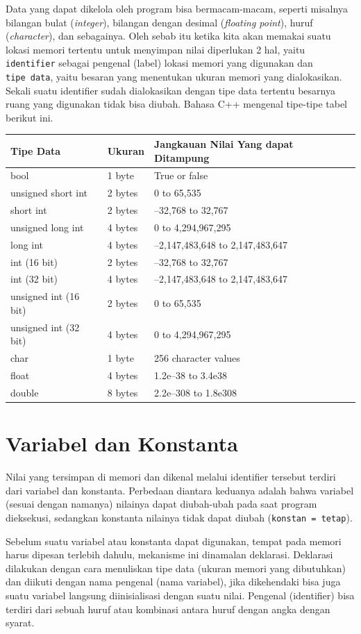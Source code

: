 Data yang dapat dikelola oleh program bisa bermacam-macam, seperti
misalnya bilangan bulat (\emph{integer}), bilangan dengan desimal
(\emph{floating point}), huruf (\emph{character}), dan sebagainya. Oleh
sebab itu ketika kita akan memakai suatu lokasi memori tertentu untuk
menyimpan nilai diperlukan 2 hal, yaitu \texttt{identifier} sebagai
pengenal (label) lokasi memori yang digunakan dan \texttt{tipe\ data},
yaitu besaran yang menentukan ukuran memori yang dialokasikan. Sekali
suatu identifier sudah dialokasikan dengan tipe data tertentu besarnya
ruang yang digunakan tidak bisa diubah. Bahasa C++ mengenal tipe-tipe
tabel berikut ini.


\begin{longtable}[]{@{}lll@{}}
\toprule
Tipe Data & Ukuran & Jangkauan Nilai Yang dapat Ditampung\tabularnewline
\midrule
\endhead
bool & 1 byte & True or false\tabularnewline
unsigned short int & 2 bytes & 0 to 65,535\tabularnewline
short int & 2 bytes & --32,768 to 32,767\tabularnewline
unsigned long int & 4 bytes & 0 to 4,294,967,295\tabularnewline
long int & 4 bytes & --2,147,483,648 to 2,147,483,647\tabularnewline
int (16 bit) & 2 bytes & --32,768 to 32,767\tabularnewline
int (32 bit) & 4 bytes & --2,147,483,648 to 2,147,483,647\tabularnewline
unsigned int (16 bit) & 2 bytes & 0 to 65,535\tabularnewline
unsigned int (32 bit) & 4 bytes & 0 to 4,294,967,295\tabularnewline
char & 1 byte & 256 character values\tabularnewline
float & 4 bytes & 1.2e--38 to 3.4e38\tabularnewline
double & 8 bytes & 2.2e--308 to 1.8e308\tabularnewline
\bottomrule

\end{longtable}


\section{Variabel dan Konstanta}\label{variabel-dan-konstanta}

Nilai yang tersimpan di memori dan dikenal melalui identifier tersebut
terdiri dari variabel dan konstanta. Perbedaan diantara keduanya adalah
bahwa variabel (sesuai dengan namanya) nilainya dapat diubah-ubah pada
saat program dieksekusi, sedangkan konstanta nilainya tidak dapat diubah
(\texttt{konstan\ =\ tetap}).

Sebelum suatu variabel atau konstanta dapat digunakan, tempat pada
memori harus dipesan terlebih dahulu, mekanisme ini dinamalan deklarasi.
Deklarasi dilakukan dengan cara menuliskan tipe data (ukuran memori yang
dibutuhkan) dan diikuti dengan nama pengenal (nama variabel), jika
dikehendaki bisa juga suatu variabel langsung diinisialisasi dengan
suatu nilai. Pengenal (identifier) bisa terdiri dari sebuah huruf atau
kombinasi antara huruf dengan angka dengan syarat.


